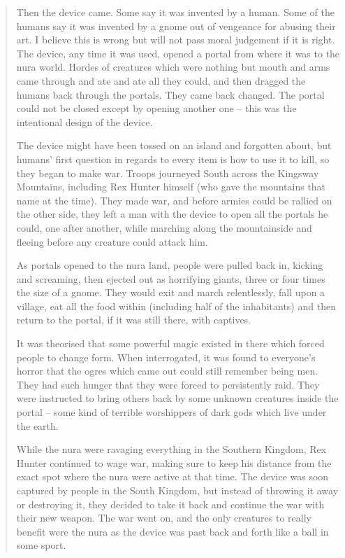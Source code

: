 \begin{multicols}{2}
\begin{quotation}
	Then the device came.  Some say it was invented by a human.  Some of the humans say it was invented by a gnome out of vengeance for abusing their art.  I believe this is wrong but will not pass moral judgement if it is right.  The device, any time it was used, opened a portal from where it was to the nura world.  Hordes of creatures which were nothing but mouth and arms came through and ate and ate all they could, and then dragged the humans back through the portals.  They came back changed.  The portal could not be closed except by opening another one -- this was the intentional design of the device.

	The device might have been tossed on an island and forgotten about, but humans' first question in regards to every item is how to use it to kill, so they began to make war.  Troops journeyed South across the Kingsway Mountains, including Rex Hunter himself (who gave the mountains that name at the time).  They made war, and before armies could be rallied on the other side, they left a man with the device to open all the portals he could, one after another, while marching along the mountainside and fleeing before any creature could attack him.

	As portals opened to the nura land, people were pulled back in, kicking and screaming, then ejected out as horrifying giants, three or four times the size of a gnome.  They would exit and march relentlessly, fall upon a village, eat all the food within (including half of the inhabitants) and then return to the portal, if it was still there, with captives.

	It was theorised that some powerful magic existed in there which forced people to change form.  When interrogated, it was found to everyone's horror that the ogres which came out could still remember being men.  They had such hunger that they were forced to persistently raid.  They were instructed to bring others back by some unknown creatures inside the portal -- some kind of terrible worshippers of dark gods which live under the earth.

	While the nura were ravaging everything in the Southern Kingdom, Rex Hunter continued to wage war, making sure to keep his distance from the exact spot where the nura were active at that time.  The device was soon captured by people in the South Kingdom, but instead of throwing it away or destroying it, they decided to take it back and continue the war with their new weapon.  The war went on, and the only creatures to really benefit were the nura as the device was past back and forth like a ball in some sport.


\end{quotation}
\end{multicols}
